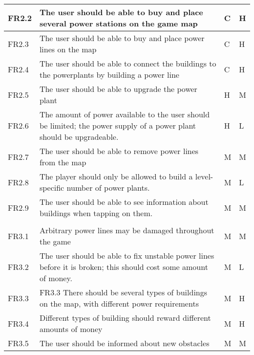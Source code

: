 \begin{longtable}{| p{1.5cm} | p{8cm} | p{1.5cm} | p{2cm} |}
      FR2.2 & The user should be able to buy and place several power stations on the game map & C & H \\ \hline

      FR2.3 & The user should be able to buy and place power lines on the map & C & H \\ \hline

      FR2.4 & The user should be able to connect the buildings to the powerplants by building a power 
      line & C & H \\ \hline

      FR2.5 & The user should be able to upgrade the power plant & H & M \\ \hline

      FR2.6 & The amount of power available to the user should be limited; the power supply of a 
      power plant should be upgradeable. & H & L \\ \hline

      FR2.7 & The user should be able to remove power lines from the map & M & M \\ \hline

      FR2.8 & The player should only be allowed to build a level-specific number of power plants. & M & L \\ \hline

      FR2.9 & The user should be able to see information about buildings when tapping on them. & M & M \\ \hline
   \pagebreak
   \hline
   \multicolumn{4}{|>{\columncolor[gray]{.8}}l|}{3) Obstacles} \\ \hline

      FR3.1 & Arbitrary power lines may be damaged throughout the game & M & M \\ \hline

      FR3.2 & The user should be able to fix unstable power lines before it is broken; 
      this should cost some amount of money. & M & L \\ \hline

      FR3.3 & FR3.3 There should be several types of buildings on the map, with different power 
      requirements & M & H \\ \hline

      FR3.4 & Different types of building should reward different amounts of money & 
      M & H \\ \hline

      FR3.5 & The user should be informed about new obstacles & M & M \\ \hline


\end{longtable}
